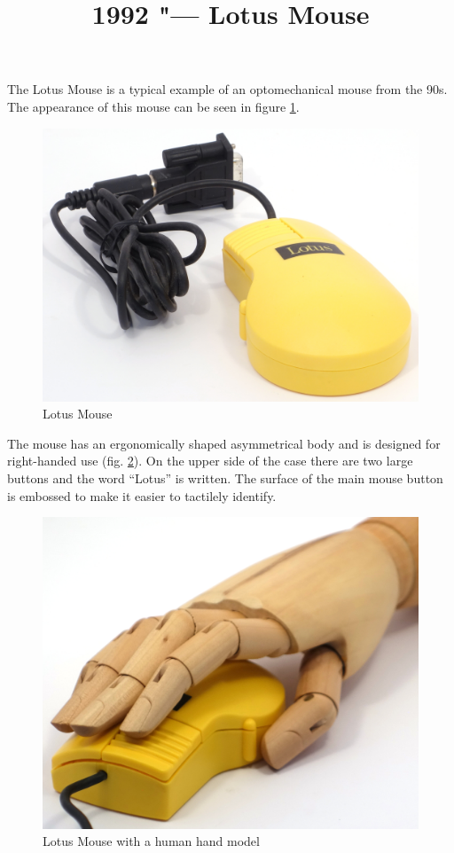 \documentclass[11pt, a4paper]{article}
\begin{document}
\title{1992 "--- Lotus Mouse}
\date{}
\maketitle
{}
The Lotus Mouse is a typical example of an optomechanical mouse from the 90s. The appearance of this mouse can be seen in figure \ref{fig:LotusPic}.

\begin{figure}[h]
    \centering
    \includegraphics[scale=0.6]{1992_lotus_mouse/pic_30.jpg}
    \caption{Lotus Mouse}
    \label{fig:LotusPic}
\end{figure}

The mouse has an ergonomically shaped asymmetrical body and is designed for right-handed use (fig. \ref{fig:LotusHand}). On the upper side of the case there are two large buttons and the word “Lotus” is written. The surface of the main mouse button is embossed to make it easier to tactilely identify.

\begin{figure}[h]
    \centering
    \includegraphics[scale=0.3]{1992_lotus_mouse/hand_30.jpg}
    \caption{Lotus Mouse with a human hand model}
    \label{fig:LotusHand}
\end{figure}
\end{document}
